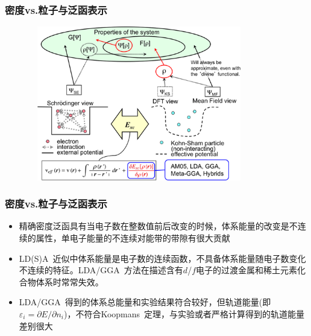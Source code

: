 \frame
{
	\frametitle{密度\textrm{vs.}粒子与泛函表示}
\begin{figure}[h!]
\vskip -10pt
\centering
\includegraphics[height=2.65in,width=3.8in,viewport=0 0 362 275,clip]{Figures/DFT-particle-density.png}
\caption{\fontsize{6.0pt}{4.5pt}}%
\label{Schrodinger-equation-vs-Kohn-Sham-equation}
\end{figure}
}

\frame
{
	\frametitle{密度\textrm{vs.}粒子与泛函表示}
\begin{itemize}
\setlength{\itemsep}{12pt}
	\item 精确密度泛函具有当电子数在整数值前后改变的时候，体系能量的改变是不连续的属性，单电子能量的不连续对能带的带隙有很大贡献
	 \item\textrm{LD(S)A~}近似中体系能量是电子数的连续函数，不具备体系能量随电子数变化不连续的特征。\textrm{LDA/GGA~}方法在描述含有$d$/$f$电子的过渡金属和稀土元素化合物体系时常常失效。
	\item \textrm{LDA}/\textrm{GGA~}得到的体系总能量和实验结果符合较好，但轨道能量(即$\varepsilon_i=\partial E/\partial n_i$)，不符合\textrm{Koopmans~}定理，与实验或者严格计算得到的轨道能量差别很大%
\end{itemize}
}

